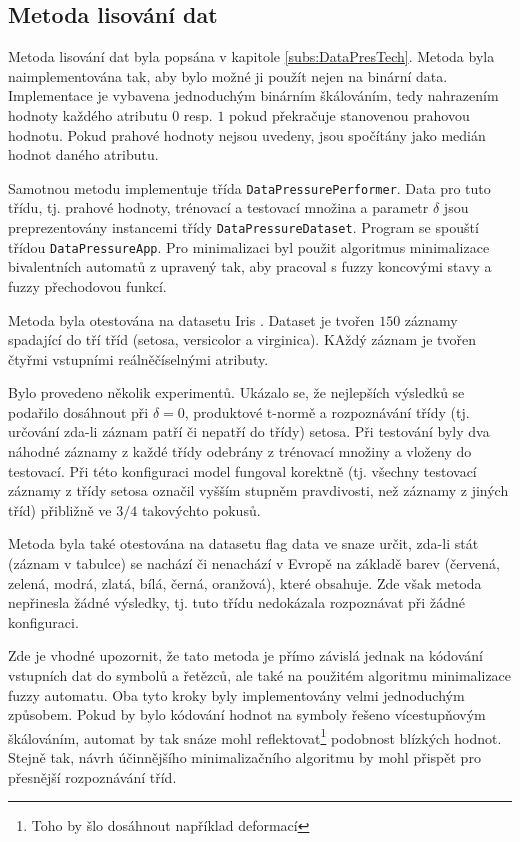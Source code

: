 \documentclass[a4paper,10pt]{article}
\begin{document}
\subsection{Metoda lisování dat} \label{subs:DataPresImpl}

Metoda lisování dat byla popsána v kapitole \ref{subs:DataPresTech}. Metoda byla naimplementována tak, aby bylo možné ji použít nejen na binární data. Implementace je vybavena jednoduchým binárním škálováním, tedy nahrazením hodnoty každého atributu $0$ resp. $1$ pokud překračuje stanovenou prahovou hodnotu. Pokud prahové hodnoty nejsou uvedeny, jsou spočítány jako medián hodnot daného atributu.

Samotnou metodu implementuje třída \verb|DataPressurePerformer|. Data pro tuto třídu, tj. prahové hodnoty, trénovací a testovací množina a parametr $\delta$ jsou preprezentovány instancemi třídy \verb|DataPressureDataset|. Program se spouští třídou \verb|DataPressureApp|. Pro minimalizaci byl použit algoritmus minimalizace bivalentních automatů z \cite{Koz-AutComp} upravený tak, aby pracoval s fuzzy koncovými stavy a fuzzy přechodovou funkcí.

Metoda byla otestována na datasetu Iris \cite{web-IrisDataset}. Dataset je tvořen $150$ záznamy spadající do tří tříd (setosa, versicolor a virginica). KAždý záznam je tvořen čtyřmi vstupními reálněčíselnými atributy.

Bylo provedeno několik experimentů. Ukázalo se, že nejlepších výsledků se podařilo dosáhnout při $\delta = 0$, produktové t-normě a rozpoznávání třídy (tj. určování zda-li záznam patří či nepatří do třídy) setosa. Při testování byly dva náhodné záznamy z každé třídy odebrány z trénovací množiny a vloženy do testovací. Při této konfiguraci model fungoval korektně (tj. všechny testovací záznamy z třídy setosa označil vyšším stupněm pravdivosti, než záznamy z jiných tříd) přibližně ve $3/4$ takovýchto pokusů.

Metoda byla také otestována na datasetu flag data \cite{web-FlagsDataset} ve snaze určit, zda-li stát (záznam v tabulce) se nachází či nenachází v Evropě na základě barev (červená, zelená, modrá, zlatá, bílá, černá, oranžová), které obsahuje. Zde však metoda nepřinesla žádné výsledky, tj. tuto třídu nedokázala rozpoznávat při žádné konfiguraci.

Zde je vhodné upozornit, že tato metoda je přímo závislá jednak na kódování vstupních dat do symbolů a řetězců, ale také na použitém algoritmu minimalizace fuzzy automatu. Oba tyto kroky byly implementovány velmi jednoduchým způsobem. Pokud by bylo kódování hodnot na symboly řešeno vícestupňovým škálováním, automat by tak snáze mohl reflektovat\footnote{Toho by šlo dosáhnout například deformací } podobnost blízkých hodnot. Stejně tak, návrh účinnějšího minimalizačního algoritmu by mohl přispět pro přesnější rozpoznávání tříd.
\end{document}
